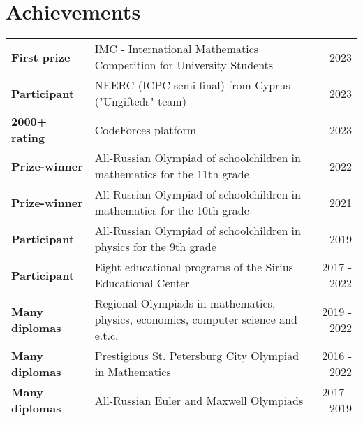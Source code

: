 \documentclass[a4paper,11pt]{article}
\makeatletter
\newcommand{\resumeProject}[4]{
\vspace{0mm}\item[]
    \begin{tabular*}{\textwidth}[t]{l@{\extracolsep{\fill}}r}
        \hspace{-4.4mm} \small\textbf{#1} & {\footnotesize{#3}}\vspace{-1mm}\\
        \hspace{-4.3mm} \footnotesize{\text{#2}} & \footnotesize{#4}
    \end{tabular*}
    \vspace{-6.5mm}
}
\newcommand{\resumeAchieve}[3]
{
\hspace{-3.1mm}\textbf{ #1} & {#2} & \hspace{3mm}\footnotesize{#3}
\vspace{0mm}\\
}
\newcommand{\resumeItemListStart}{\begin{justify}\begin{itemize}[leftmargin=3ex, rightmargin=2ex, noitemsep,labelsep=1.2mm,itemsep=0mm]\small}
\newcommand{\resumeSubHeadingListEnd}{\end{itemize}\vspace{-2mm}}
\newcommand{\resumeItemListEnd}{\end{itemize}\end{justify}\vspace{-1.5mm}}
\makeatother
\begin{document}






\section{Achievements}
\vspace{0.2mm}
\small{\begin{tabular*}{\textwidth}[t]{p{} p{}@{\extracolsep{\fill}}r}


\resumeAchieve{First prize}{IMC - International Mathematics Competition
for University Students}{2023}

\resumeAchieve{Participant}{NEERC (ICPC semi-final) from Cyprus ("Ungifteds" team)}{2023}

\resumeAchieve{2000+ rating}{CodeForces platform}{2023}

\resumeAchieve{Prize-winner}{All-Russian Olympiad of schoolchildren in mathematics for the 11th grade}{2022}

\resumeAchieve{Prize-winner}{All-Russian Olympiad of schoolchildren in mathematics for the 10th grade}{2021}

\resumeAchieve{Participant}{All-Russian Olympiad of schoolchildren in physics for the 9th grade}{2019}

\resumeAchieve{Participant}{Eight educational programs of the Sirius Educational Center}{2017 - 2022}

\resumeAchieve{Many diplomas}{Regional Olympiads in mathematics, physics, economics, computer science and e.t.c.}{2019 - 2022}

\resumeAchieve{Many diplomas}{Prestigious St. Petersburg City Olympiad in Mathematics}{2016 - 2022}

\resumeAchieve{Many diplomas}{All-Russian Euler and Maxwell Olympiads}{2017 - 2019}
\end{tabular*}}
\end{document}

